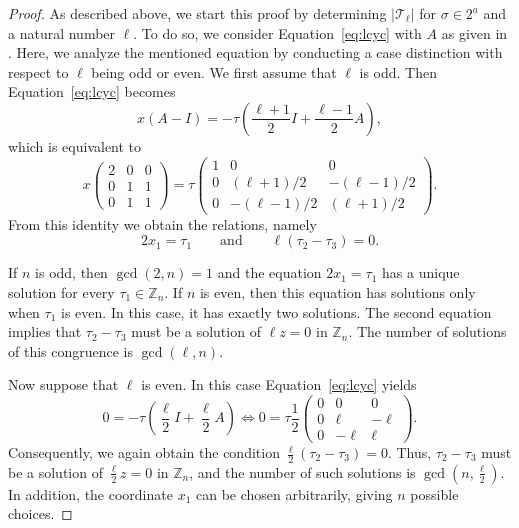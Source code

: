 \documentclass[12pt]{article}
\theoremstyle{definition}
\theoremstyle{remark}
\begin{document}
\begin{proof}
As described above, we start this proof by determining $\vert \mathcal{T}_\ell\vert $ for $\sigma\in 2^a$ and a natural number $\ell$.
To do so, we consider Equation~\eqref{eq:lcyc} with $A$ as given in . Here,
we analyze the mentioned equation by conducting a case distinction with respect to $\ell$ being odd or even.
We first assume that $\ell$ is odd. Then Equation~\eqref{eq:lcyc} becomes
\[
x(A-I)=-\tau\!\left(\frac{\ell+1}{2}I+\frac{\ell-1}{2}A\right),
\]
which is equivalent to
\[
x
\begin{pmatrix}
2&0&0\\
0&1&1\\
0&1&1
\end{pmatrix}
=
\tau
\begin{pmatrix}
1&0&0\\
0&(\ell+1)/2&-(\ell-1)/2\\
0&-(\ell-1)/2&(\ell+1)/2
\end{pmatrix}.
\]
From this identity we obtain the relations, namely
\[
2x_1=\tau_1
\qquad\text{and}\qquad
\ell(\tau_2-\tau_3)=0.
\]

 If $n$ is odd, then $\gcd(2,n)=1$ and the equation $2x_1=\tau_1$ has a unique solution for every $\tau_1\in\mathbb Z_n$. If $n$ is even, then this equation has solutions only when $\tau_1$ is even. In this case, it has exactly two solutions. The second equation implies that $\tau_2-\tau_3$ must be a solution of $\ell z=0$ in $\mathbb Z_n$. The number of solutions of this congruence is $\gcd(\ell,n)$.

Now suppose that $\ell$ is even. In this case Equation~\eqref{eq:lcyc} yields
\[
0=-\tau\!\left(\frac{\ell}{2}I+\frac{\ell}{2}A\right)
\Longleftrightarrow
0=
\tau
\frac{1}{2}\begin{pmatrix}
0&0&0\\
0&\ell&-\ell\\
0&-\ell&\ell
\end{pmatrix}.
\]
Consequently, we again obtain the condition
$
\frac{\ell}{2}(\tau_2-\tau_3)=0.
$
Thus, $\tau_2-\tau_3$ must be a solution of $\frac{\ell}{2} z=0$ in $\mathbb Z_n$, and the number of such solutions is $\gcd(n,\frac{\ell}{2})$. In addition, the coordinate $x_1$ can be chosen arbitrarily, giving $n$ possible choices.


\end{proof}
\end{document}
